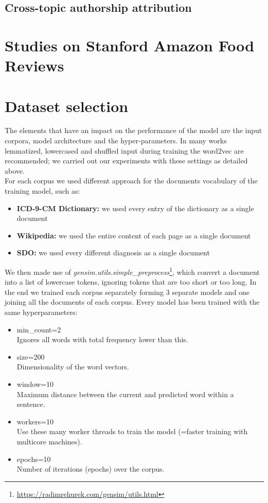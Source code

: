 \subsection{Cross-topic authorship attribution}

\section{Studies on Stanford Amazon Food Reviews}

\section{Dataset selection}


The elements that have an impact on the performance of the model are the input corpora, model architecture and the hyper-parameters.
In many works lemmatized, lowercased and shuffled input during training the word2vec are recommended; we carried out our experiments with these settings as detailed above.\\
For each corpus we used different approach for the documents vocabulary of the training model, such as:
\begin{itemize}
	\item \textbf{ICD-9-CM Dictionary:} we used every entry of the dictionary as a single document
	\item \textbf{Wikipedia:} we used the entire content of each page as a single document
	\item \textbf{SDO:} we used every different diagnosis as a single document
\end{itemize}

We then made use of \textit{gensim.utils.simple\_preprocess}\footnote{\url{https://radimrehurek.com/gensim/utils.html}}, which convert a document into a list of lowercase tokens, ignoring tokens that are too short or too long.
In the end we trained each corpus separately forming 3 separate models and one joining all the documents of each corpus. Every model has been trained with the same hyperparameters:
\begin{itemize}
	\item min\_count=2 \\
	Ignores all words with total frequency lower than this.
	\item size=200 \\
	Dimensionality of the word vectors.
	\item window=10\\
	Maximum distance between the current and predicted word within a sentence.
	\item workers=10 \\
	Use these many worker threads to train the model (=faster training with multicore machines).
	\item epochs=10 \\
	Number of iterations (epochs) over the corpus.
\end{itemize}


